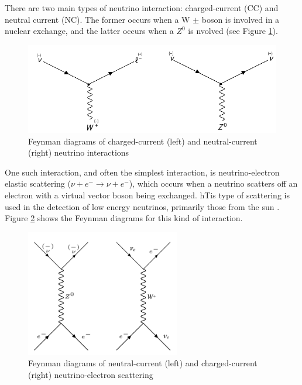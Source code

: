 There are two main types of neutrino interaction: charged-current (CC) and neutral current (NC). The former occurs when a W $\pm$ boson is involved in a nuclear exchange, and the latter occurs when a $Z^{0}$ is nvolved (see Figure \ref{fig:CC_NC}).

\begin{figure}
    \centering
    \includegraphics[width=\textwidth]{Figures/CC_NC.png}
    \caption{Feynman diagrams of charged-current (left) and neutral-current (right) neutrino interactions}
    \label{fig:CC_NC}
\end{figure}


One such interaction, and often the simplest interaction, is neutrino-electron elastic scattering ($\nu+e^{-} \rightarrow \nu+e^{-}$), which occurs when a neutrino scatters off an electron with a virtual vector boson being exchanged. hTis type of scattering is used in the detection of low energy neutrinos, primarily those from the sun \cite{RevModPhys.59.505}. Figure \ref{fig:elastic_scattering} shows the Feynman diagrams for this kind of interaction.

\begin{figure}
    \centering
    \includegraphics[width=0.6\textwidth]{Figures/elastic_scattering.png}
    \caption{Feynman diagrams of neutral-current (left) and charged-current (right) neutrino-electron scattering}
    \label{fig:elastic_scattering}
\end{figure}

